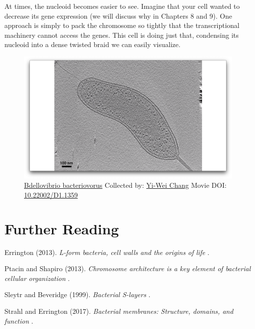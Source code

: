 \documentclass[]{tufte-book}
\begin{document}
At times, the nucleoid becomes easier to see. Imagine that your cell
wanted to decrease its gene expression (we will discuss why in Chapters
8 and 9). One approach is simply to pack the chromosome so tightly that
the transcriptional machinery cannot access the genes. This cell is
doing just that, condensing its nucleoid into a dense twisted braid we
can easily visualize.





\begin{figure}
\includegraphics{movie_stills/2_10} \caption[\protect\hyperlink{tree}{Bdellovibrio bacteriovorus}
Collected by: \protect\hyperlink{yi-wei_chang}{Yi-Wei Chang} Movie DOI:
\href{https://doi.org/10.22002/D1.1359}{10.22002/D1.1359}]{\protect\hyperlink{tree}{Bdellovibrio bacteriovorus}
Collected by: \protect\hyperlink{yi-wei_chang}{Yi-Wei Chang} Movie DOI:
\href{https://doi.org/10.22002/D1.1359}{10.22002/D1.1359}}\label{fig:2-10}
\end{figure}

\section{Further Reading}\label{further-reading}

Errington (2013). \emph{L-form bacteria, cell walls and the origins of
life} \citep{errington2013}.

Ptacin and Shapiro (2013). \emph{Chromosome architecture is a key
element of bacterial cellular organization} \citep{ptacin2013}.

Sleytr and Beveridge (1999). \emph{Bacterial S-layers}
\citep{sleytr1999}.

Strahl and Errington (2017). \emph{Bacterial membranes: Structure,
domains, and function} \citep{strahl2017}.
\end{document}
